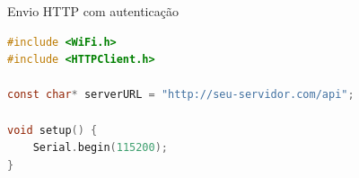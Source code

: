 \begin{frame}[fragile]{Envio HTTP com autenticação}
\begin{lstlisting}[language=C, basicstyle=\tiny\ttfamily]
#include <WiFi.h>
#include <HTTPClient.h>

const char* serverURL = "http://seu-servidor.com/api";

void setup() {
    Serial.begin(115200);
}
\end{lstlisting}
\end{frame}
    
    